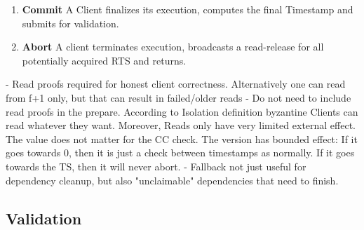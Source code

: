 \begin{enumerate}
\item \textbf{Commit} A Client finalizes its execution, computes the final Timestamp and submits for validation.

\item \textbf{Abort} A client terminates execution, broadcasts a read-release for all potentially acquired RTS and returns.

\end{enumerate}
 


- Read proofs required for honest client correctness. Alternatively one can read from f+1 only, but that can result in failed/older reads
- Do not need to include read proofs in the prepare. According to Isolation definition byzantine Clients can read whatever they want. Moreover, Reads only have very limited external effect. The value does not matter for the CC check. The version has bounded effect: If it goes towards 0, then it is just a check between timestamps as normally. If it goes towards the TS, then it will never abort.
- Fallback not just useful for dependency cleanup, but also "unclaimable" dependencies that need to finish.
\subsection{Validation}

